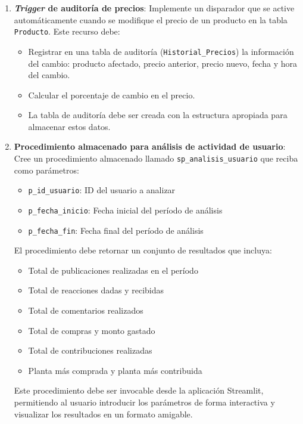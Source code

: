 \documentclass[10pt]{article}
\begin{document}
\begin{enumerate}
\begin{enumerate}
			\item \textbf{\emph{Trigger} de auditoría de precios}: Implemente un disparador que se active automáticamente cuando se modifique el precio de un producto en la tabla \texttt{Producto}. Este recurso debe:
			\begin{itemize}
				\item Registrar en una tabla de auditoría (\texttt{Historial\_Precios}) la información del cambio: producto afectado, precio anterior, precio nuevo, fecha y hora del cambio.
				\item Calcular el porcentaje de cambio en el precio.
				\item La tabla de auditoría debe ser creada con la estructura apropiada para almacenar estos datos.
			\end{itemize}
			
			\item \textbf{Procedimiento almacenado para análisis de actividad de usuario}: Cree un procedimiento almacenado llamado \texttt{sp\_analisis\_usuario} que reciba como parámetros:
			\begin{itemize}
				\item \texttt{p\_id\_usuario}: ID del usuario a analizar
				\item \texttt{p\_fecha\_inicio}: Fecha inicial del período de análisis
				\item \texttt{p\_fecha\_fin}: Fecha final del período de análisis
			\end{itemize}
			El procedimiento debe retornar un conjunto de resultados que incluya:
			\begin{itemize}
				\item Total de publicaciones realizadas en el período
				\item Total de reacciones dadas y recibidas
				\item Total de comentarios realizados
				\item Total de compras y monto gastado
				\item Total de contribuciones realizadas
				\item Planta más comprada y planta más contribuida
			\end{itemize}
			Este procedimiento debe ser invocable desde la aplicación Streamlit, permitiendo al usuario introducir los parámetros de forma interactiva y visualizar los resultados en un formato amigable.
			

\end{enumerate}
\end{enumerate}
\end{document}
